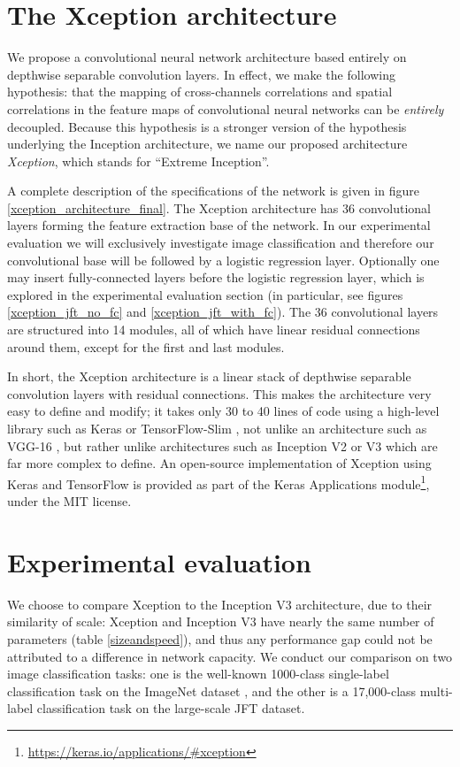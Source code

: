 \section{The Xception architecture}

We propose a convolutional neural network architecture based entirely on depthwise separable convolution layers. In effect, we make the following hypothesis: that the mapping of cross-channels correlations and spatial correlations in the feature maps of convolutional neural networks can be \textit{entirely} decoupled. Because this hypothesis is a stronger version of the hypothesis underlying the Inception architecture, we name our proposed architecture \textit{Xception}, which stands for ``Extreme Inception''.

A complete description of the specifications of the network is given in figure \ref{xception_architecture_final}. The Xception architecture has 36 convolutional layers forming the feature extraction base of the network. In our experimental evaluation we will exclusively investigate image classification and therefore our convolutional base will be followed by a logistic regression layer. Optionally one may insert fully-connected layers before the logistic regression layer, which is explored in the experimental evaluation section (in particular, see figures \ref{xception_jft_no_fc} and \ref{xception_jft_with_fc}). The 36 convolutional layers are structured into 14 modules, all of which have linear residual connections around them, except for the first and last modules.

In short, the Xception architecture is a linear stack of depthwise separable convolution layers with residual connections. This makes the architecture very easy to define and modify; it takes only 30 to 40 lines of code using a high-level library such as Keras \cite{chollet2015keras} or TensorFlow-Slim \cite{tfslim}, not unlike an architecture such as VGG-16 \cite{simonyan2014very}, but rather unlike architectures such as Inception V2 or V3 which are far more complex to define. An open-source implementation of Xception using Keras and TensorFlow is provided as part of the Keras Applications module\footnote{\url{https://keras.io/applications/\#xception}}, under the MIT license.

\section{Experimental evaluation}

We choose to compare Xception to the Inception V3 architecture, due to their similarity of scale: Xception and Inception V3 have nearly the same number of parameters (table \ref{sizeandspeed}), and thus any performance gap could not be attributed to a difference in network capacity. We conduct our comparison on two image classification tasks: one is the well-known 1000-class single-label classification task on the ImageNet dataset \cite{russakovsky2014imagenet}, and the other is a 17,000-class multi-label classification task on the large-scale JFT dataset.

